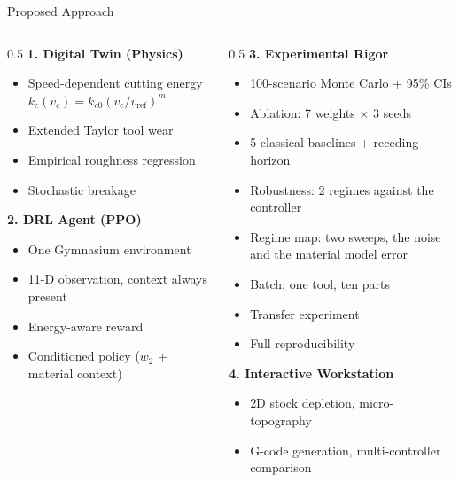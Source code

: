 \documentclass[11pt,aspectratio=169]{beamer}
\begin{document}
\begin{frame}{Proposed Approach}
    \footnotesize
    \begin{columns}[T]
        \begin{column}{0.5\textwidth}
            \textbf{1. Digital Twin (Physics)}
            \begin{itemize}
                \item Speed-dependent cutting energy $k_c(v_c) = k_{c0}(v_c/v_{\text{ref}})^m$
                \item Extended Taylor tool wear
                \item Empirical roughness regression
                \item Stochastic breakage
            \end{itemize}

            \textbf{2. DRL Agent (PPO)}
            \begin{itemize}
                \item One Gymnasium environment
                \item 11-D observation, context always present
                \item Energy-aware reward
                \item Conditioned policy ($w_2$ + material context)
            \end{itemize}
        \end{column}
        \begin{column}{0.5\textwidth}
            \textbf{3. Experimental Rigor}
            \begin{itemize}
                \item 100-scenario Monte Carlo + 95\% CIs
                \item Ablation: 7 weights $\times$ 3 seeds
                \item 5 classical baselines + receding-horizon
                \item Robustness: 2 regimes against the controller
                \item Regime map: two sweeps, the noise and the material model error
                \item Batch: one tool, ten parts
                \item Transfer experiment
                \item Full reproducibility
            \end{itemize}

            \textbf{4. Interactive Workstation}
            \begin{itemize}
                \item 2D stock depletion, micro-topography
                \item G-code generation, multi-controller comparison
            \end{itemize}
        \end{column}
    \end{columns}
\end{frame}
\end{document}
